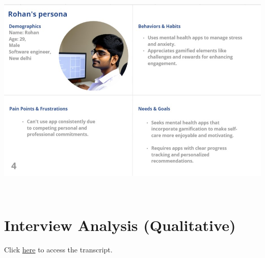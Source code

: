 \documentclass[manuscript,screen,review]{acmart}
\begin{document}
    \includegraphics[width=6.26806in,height=4.19722in]{vertopal.com_Personas/vertopal_68c5e293405b4e92b3a0f3d4afe53fc3/media/image4.jpeg}


\newline


\section{Interview Analysis (Qualitative)}
Click \href{https://docs.google.com/document/d/1MPaA-0VwmMxalHK1cTz1QMZmGF4sPHEAJa-ONISMrXk/edit}{here} to access the transcript.
\end{document}
